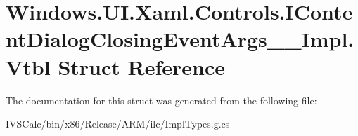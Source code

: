 \hypertarget{struct_windows_1_1_u_i_1_1_xaml_1_1_controls_1_1_i_content_dialog_closing_event_args_____impl_1_1_vtbl}{}\section{Windows.\+U\+I.\+Xaml.\+Controls.\+I\+Content\+Dialog\+Closing\+Event\+Args\+\_\+\+\_\+\+Impl.\+Vtbl Struct Reference}
\label{struct_windows_1_1_u_i_1_1_xaml_1_1_controls_1_1_i_content_dialog_closing_event_args_____impl_1_1_vtbl}


The documentation for this struct was generated from the following file\+:\begin{DoxyCompactItemize}
\item 
I\+V\+S\+Calc/bin/x86/\+Release/\+A\+R\+M/ilc/Impl\+Types.\+g.\+cs\end{DoxyCompactItemize}
